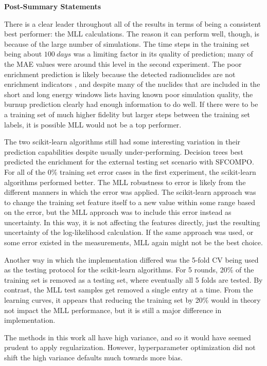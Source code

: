 \noindent \textbf{Post-Summary Statements}

There is a clear leader throughout all of the results in terms of being a
consistent best performer: the \gls{MLL} calculations. The reason it can
perform well, though, is because of the large number of simulations.  The time
steps in the training set being about $100\:days$ was a limiting factor in its
quality of prediction; many of the \gls{MAE} values were around this level in
the second experiment. The poor enrichment prediction is likely because the
detected radionuclides are not enrichment indicators , and despite
many of the nuclides that are included in the short and long energy windows
lists having known poor simulation quality, the burnup prediction clearly had
enough information to do well.  If there were to be a training set of much
higher fidelity but larger steps between the training set labels, it is
possible \gls{MLL} would not be a top performer. 

The two scikit-learn algorithms still had some interesting variation in their
prediction capabilities despite usually under-performing. Decision trees best
predicted the enrichment for the external testing set scenario with
\gls{SFCOMPO}. For all of the 0\% training set error cases in the first
experiment, the scikit-learn algorithms performed better.  The \gls{MLL}
robustness to error is likely from the different manners in which the error was
applied.  The scikit-learn approach was to change the training set feature
itself to a new value within some range based on the error, but the \gls{MLL}
approach was to include this error instead as uncertainty. In this way, it is
not affecting the features directly, just the resulting uncertainty of the
log-likelihood calculation. If the same approach was used, or some error
existed in the measurements, \gls{MLL} again might not be the best choice. 

Another way in which the implementation differed was the 5-fold \gls{CV} being
used as the testing protocol for the scikit-learn algorithms. For 5 rounds,
20\% of the training set is removed as a testing set, where eventually all 5
folds are tested.  By contrast, the \gls{MLL} test samples get removed a single
entry at a time.  From the learning curves, it appears that reducing the
training set by 20\% would in theory not impact the \gls{MLL} performance, but
it is still a major difference in implementation. 

The methods in this work all have high variance, and so it would have seemed
prudent to apply regularization. However, hyperparameter optimization did not
shift the high variance defaults much towards more bias.  


